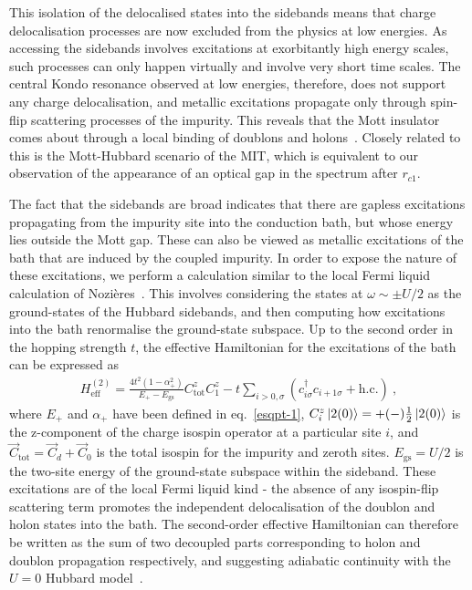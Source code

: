 \documentclass{iopart}
\begin{document}
This isolation of the delocalised states into the sidebands means that charge delocalisation processes are now excluded from the physics at low energies. As accessing the sidebands involves excitations at exorbitantly high energy scales, such processes can only happen virtually and involve very short time scales. The central Kondo resonance observed at low energies, therefore, does not support any charge delocalisation, and metallic excitations propagate only through spin-flip scattering processes of the impurity. This reveals that the Mott insulator comes about through a local binding of doublons and holons~\cite{Mott_1949,kohn1964theory,castellani_1979}. Closely related to this is the Mott-Hubbard scenario of the MIT, which is equivalent to our observation of the appearance of an optical gap in the spectrum after \(r_{c1}\).

The fact that the sidebands are broad indicates that there are gapless excitations propagating from the impurity site into the conduction bath, but whose energy lies outside the Mott gap. These can also be viewed as metallic excitations of the bath that are induced by the coupled impurity. In order to expose the nature of these excitations, we perform a calculation similar to the local Fermi liquid calculation of Nozières~\cite{nozieres1974fermi}. This involves considering the states at \(\omega \sim \pm U/2\) as the ground-states of the Hubbard sidebands, and then computing how excitations into the bath renormalise the ground-state subspace. Up to the second order in the hopping strength \(t\), the effective Hamiltonian for the excitations of the bath can be expressed as
\begin{eqnarray}
H_\text{eff}^{(2)} = \frac{4t^2(1 - \alpha_+^2)}{E_+ - E_\text{gs}}C_\text{tot}^z C_1^z - t\sum_{i >0,\sigma}\left(c^\dagger_{i\sigma}c_{i+1\sigma} + \text{h.c.}\right) ~,\label{hodoLFL}
\end{eqnarray}
where \(E_+\) and \(\alpha_+\) have been defined in eq.~\eqref{esqpt-1}, \(C_i^z\ket{2(0)} = +(-)\frac{1}{2}\ket{2(0)}\) is the z-component of the charge isospin operator at a particular site $i$, and \(\vec C_\text{tot} = \vec C_d + \vec C_0\) is the total isospin for the impurity and zeroth sites.
\(E_\text{gs} = U/2\) is the two-site energy of the ground-state subspace within the sideband.
These excitations are of the local Fermi liquid kind - the absence of any isospin-flip scattering term promotes the independent delocalisation of the doublon and holon states into the bath. The second-order effective Hamiltonian can therefore be written as the sum of two decoupled parts corresponding to holon and doublon propagation respectively, and suggesting adiabatic continuity with the \(U=0\) Hubbard model~\cite{hrk_1990_prl}. 
\end{document}
